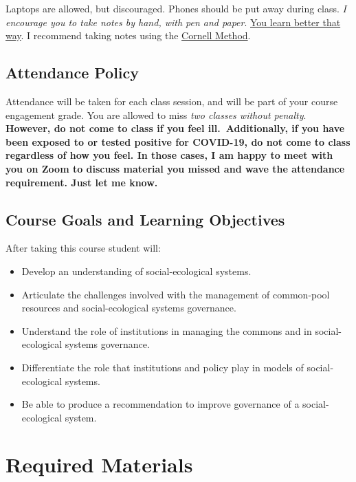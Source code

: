 \noindent Laptops are allowed, but discouraged. Phones should be put
away during class. \emph{I encourage you to take notes by hand, with pen
and paper}.
\href{https://www.nytimes.com/2017/11/27/learning/should-teachers-and-professors-ban-student-use-of-laptops-in-class.html}{You
learn better that way}. I recommend taking notes using the
\href{http://www.usu.edu/arc/idea_sheets/pdf/note_taking_cornell.pdf}{Cornell
Method}.

\hypertarget{attendance-policy}{%
\subsection{Attendance Policy}\label{attendance-policy}}

Attendance will be taken for each class session, and will be part of
your course engagement grade. You are allowed to miss \emph{two classes
without penalty}. \textbf{However, do not come to class if you feel
ill.~Additionally, if you have been exposed to or tested positive for
COVID-19, do not come to class regardless of how you feel. In those
cases, I am happy to meet with you on Zoom to discuss material you
missed and wave the attendance requirement. Just let me know.}

\hypertarget{course-goals-and-learning-objectives}{%
\subsection{Course Goals and Learning
Objectives}\label{course-goals-and-learning-objectives}}

After taking this course student will:

\begin{itemize}
\item
  Develop an understanding of social-ecological systems.
\item
  Articulate the challenges involved with the management of common-pool
  resources and social-ecological systems governance.
\item
  Understand the role of institutions in managing the commons and in
  social-ecological systems governance.
\item
  Differentiate the role that institutions and policy play in models of
  social-ecological systems.
\item
  Be able to produce a recommendation to improve governance of a
  social-ecological system.
\end{itemize}

\hypertarget{required-materials}{%
\section{Required Materials}\label{required-materials}}

